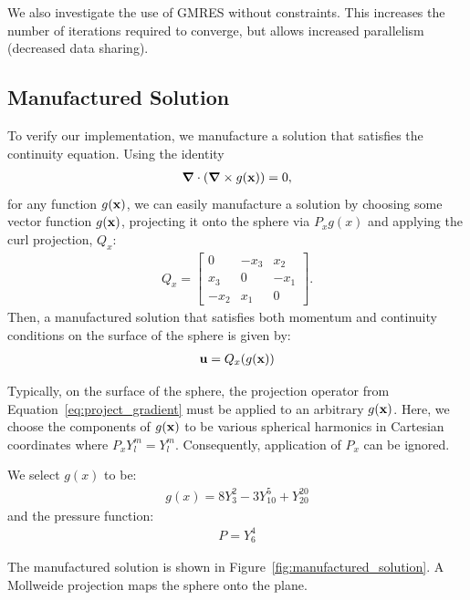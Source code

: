 We also investigate the use of GMRES without constraints. This increases the number of iterations required to converge, but allows increased parallelism (decreased data sharing). 

\subsection{Manufactured Solution}

To verify our implementation, we manufacture a solution that satisfies the continuity equation. Using the identity
\begin{align} 
\mbox{\boldmath$ \nabla $} \cdot (\mbox{\boldmath$ \nabla $} \times g(\mathbf{x})) = 0,
\end{align} 
for any function $g(\mathbf{x})$, we can easily manufacture a solution by choosing some vector function $g(\mathbf{x})$, projecting it onto the sphere via $P_x g(x)$ and applying the curl projection, $Q_x$: 
\begin{align} 
Q_x = \begin{bmatrix} 0 & -x_3 & x_2 \\ x_3 & 0 & -x_1 \\ -x_2 & x_1 & 0 \end{bmatrix}.
\end{align} 
Then, a manufactured solution that satisfies both momentum and continuity conditions on the surface of the sphere is given by: 
\begin{align} 
\mathbf{u} = Q_x (g(\mathbf{x}))
\end{align} 

Typically, on the surface of the sphere, the projection operator from Equation~\ref{eq:project_gradient} must be applied to an arbitrary $g(\mathbf{x})$. 
Here, we choose the components of $g(\mathbf{x})$ to be various spherical harmonics in Cartesian coordinates where $P_x Y_l^m = Y_l^m$. Consequently, application of $P_x$ can be ignored. 

We select $g(x)$ to be: 
\begin{align}
g(x) = 8 Y_{3}^{2} - 3Y_{10}^{5} + Y_{20}^{20} 
\end{align}
and the pressure function:
\begin{align}
P = Y_6^4 
\end{align} 

The manufactured solution is shown in Figure~\ref{fig:manufactured_solution}. A Mollweide projection \cite{Mollweide_ref} maps the sphere onto the plane. 

